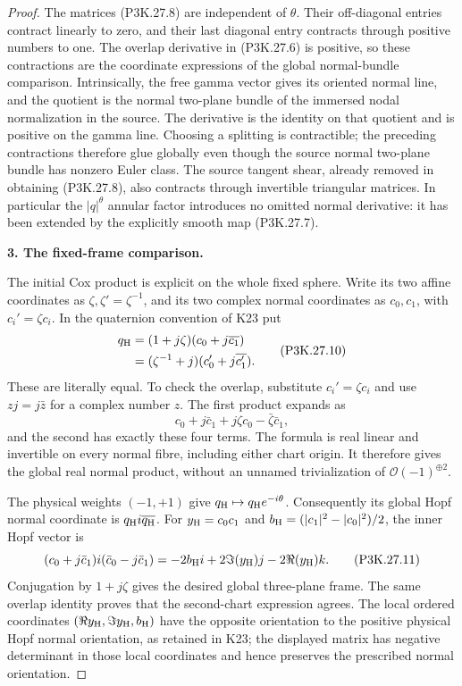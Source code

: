 \begin{proof}
The matrices (P3K.27.8) are independent of \(\theta\).
Their off-diagonal entries contract linearly to zero,
and their last diagonal entry contracts through positive
numbers to one. The overlap derivative in (P3K.27.6) is
positive, so these contractions are the coordinate
expressions of the global normal-bundle comparison.
Intrinsically, the free gamma vector gives its oriented
normal line, and the quotient is the normal two-plane
bundle of the immersed nodal normalization in the source.
The derivative is the identity on that quotient and is
positive on the gamma line. Choosing a splitting is
contractible; the preceding contractions therefore glue
globally even though the source normal two-plane bundle
has nonzero Euler class.
The source tangent shear, already removed in obtaining
(P3K.27.8), also contracts through invertible triangular
matrices. In particular the \(|q|^\theta\) annular factor
introduces no omitted normal derivative: it has been
extended by the explicitly smooth map (P3K.27.7).

\par\medskip\noindent\textbf{3. The fixed-frame comparison.}\enspace

The initial Cox product is explicit on the whole fixed
sphere. Write its two affine coordinates as
\(\zeta,\zeta'=\zeta^{-1}\), and its two complex normal
coordinates as \(c_0,c_1\), with
\(c_i'=\zeta c_i\). In the quaternion convention of K23 put
\[
\begin{aligned}
 q_{\rm H}
   &=(1+j\zeta)(c_0+j\overline{c_1})\\
   &=(\zeta^{-1}+j)(c_0'+j\overline{c_1'}).
\end{aligned}                                          \tag{P3K.27.10}
\]
These are literally equal. To check the overlap, substitute
\(c_i'=\zeta c_i\) and use
\(zj=j\bar z\) for a complex number \(z\).
The first product expands as
\[
       c_0+j\bar c_1+j\zeta c_0-\bar\zeta\bar c_1,
\]
and the second has exactly these four terms.
The formula is real linear and invertible on every normal
fibre, including either chart origin. It therefore gives
the global real normal product, without an unnamed
trivialization of \(\mathcal O(-1)^{\oplus2}\).

The physical weights \((-1,+1)\) give
\(q_{\rm H}\mapsto q_{\rm H}e^{-i\theta}\).
Consequently its global Hopf normal coordinate is
\(q_{\rm H}i\overline{q_{\rm H}}\).
For \(y_{\rm H}=c_0c_1\) and
\(b_{\rm H}=(|c_1|^2-|c_0|^2)/2\), the inner Hopf vector is
\[
 (c_0+j\bar c_1)i(\bar c_0-j\bar c_1)
   =-2b_{\rm H}i+2\Im(y_{\rm H})j-2\Re(y_{\rm H})k.
                                                        \tag{P3K.27.11}
\]
Conjugation by \(1+j\zeta\) gives the desired global
three-plane frame. The same overlap identity proves that
the second-chart expression agrees. The local ordered
coordinates \((\Re y_{\rm H},\Im y_{\rm H},b_{\rm H})\)
have the opposite orientation to the positive physical
Hopf normal orientation, as retained in K23; the displayed
matrix has negative determinant in those local coordinates
and hence preserves the prescribed normal orientation.


\end{proof}

